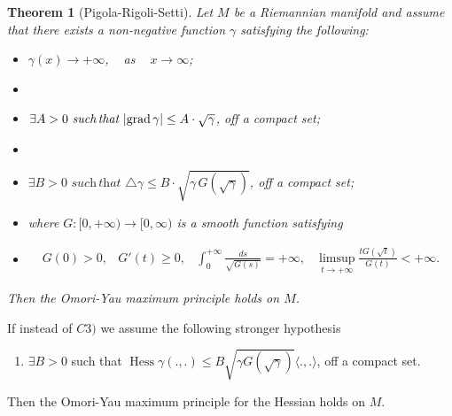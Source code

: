 \documentclass[a4paper]{amsart}
\newtheorem{theorem}{Theorem}
\begin{document}
\begin{theorem}[Pigola-Rigoli-Setti]\label{r3}
Let $M$ be a Riemannian manifold and assume that there exists a non-negative function $\gamma $ satisfying the following:
\begin{itemize}
\item[C1)] $\gamma (x) \rightarrow  +\infty $, \,\,\, as \,\,\, $x\rightarrow \infty $;
\item[]
\item[C2)] $\exists A > 0 \,\, \textit{such} \,\textit{that}  \,\, \vert {{{\rm{grad}\,}}} \gamma \vert  \leq  A \cdot \sqrt{\gamma} $, off a compact set;
\item[]
\item[C3)] $\exists B > 0 \,\, \textit{such} \,\textit{that} \,\, \triangle \gamma \leq B\cdot \sqrt{\gamma \,G(\sqrt{\gamma})} $, off a compact set;
    \item[] where $ G:[0,+\infty)\to [0, \infty) $ is a smooth function  satisfying
\item[] \begin{equation}\label{eq5}
\begin{array}{llll} G(0) > 0, &   G'(t) \geq 0,& \displaystyle{\int_{0}^{+\infty}\frac{ds}{\sqrt{G(s)}} = +\infty},&\displaystyle{\limsup_{t \rightarrow +\infty}\frac{tG(\sqrt{t})}{G(t)} < +\infty}.
\end{array}
\end{equation}
\end{itemize}
Then the Omori-Yau maximum principle holds on $M$.
\end{theorem} If instead of $C3)$ we assume the following stronger hypothesis
\begin{enumerate}
\item[C4)] $\exists B > 0 $ such that $ \operatorname{Hess} \gamma (.,.) \leq B\sqrt{\gamma G(\sqrt{\gamma})}\langle.,.\rangle $, off a compact set.
\end{enumerate}Then the Omori-Yau maximum principle for the Hessian holds on $M$.
\end{document}
